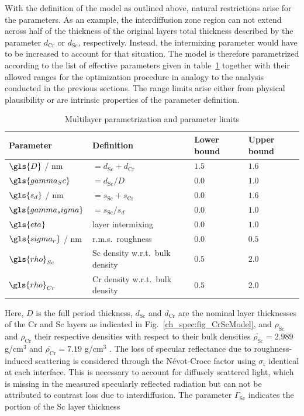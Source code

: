 With the definition of the model as outlined above, natural restrictions arise for the parameters. As an example, the interdiffusion zone region can not extend across half of the thickness of the original layers total thickness described by the parameter $d_\text{Cr}$ or $d_\text{Sc}$, respectively. Instead, the intermixing parameter would have to be increased to account for that situation. The model is therefore parametrized according to the list of effective parameters given in table~\ref{ch_spec:tbl_CrSc_gradual_parametrization} together with their allowed ranges for the optimization procedure in analogy to the analysis conducted in the previous sections. The range limits arise either from physical plausibility or are intrinsic properties of the parameter definition.
\begin{table}[htbp]
\centering
\caption{Multilayer parametrization and parameter limits}
\label{ch_spec:tbl_CrSc_gradual_parametrization}
\begin{tabular}{@{}llll@{}}
\toprule
Parameter & Definition & Lower bound & Upper bound\\ \midrule
$\gls{D}$ / nm & $= d_\text{Sc} + d_\text{Cr}$ & $1.5$&$1.6$ \\ 
$\gls{gamma_Sc}$ & $= d_\text{Sc} / D$&$0.0$ &$1.0$ \\ 
$\gls{s_d}$ / nm&$=s_\text{Sc} + s_\text{Cr}$&$0.0$ & $1.6$\\ 
$\gls{gamma_sigma}$ &$= s_\text{Sc} / s_d$& $0.0$& $1.0$\\ 
$\gls{eta}$ &layer intermixing&$0.0$& $1.0$\\ 
$\gls{sigma_r}$ / nm & r.m.s.~roughness& $0.0$& $0.5$\\ 
$\gls{rho}_{Sc}$ &Sc density w.r.t.~bulk density & $0.5$& $2.0$\\ 
$\gls{rho}_{Cr}$ &Cr density w.r.t.~bulk density& $0.5$& $2.0$\\ 
 \bottomrule
\end{tabular}
\end{table}
Here, $D$ is the full period thickness, $d_\text{Sc}$ and $d_\text{Cr}$ are the 
nominal layer thicknesses of the Cr and Sc layers as indicated in 
Fig.~\ref{ch_spec:fig_CrScModel}, and $\rho_\text{Sc}$ and $\rho_\text{Cr}$ their 
respective densities with respect to their bulk densities 
$\tilde{\rho_\text{Sc}} = 2.989$ g/cm$^3$ and $\tilde{\rho_\text{Cr}} = 7.19$ 
g/cm$^3$ \cite{henke_x-ray_1993}. The loss of specular 
reflectance due to roughness-induced scattering is considered through the 
N\'{e}vot-Croce factor using $\sigma_\text{r}$ identical at each interface. This is necessary to account for diffusely scattered light, which is missing in the measured specularly reflected radiation but can not be attributed to contrast loss due to interdiffusion. The parameter $\Gamma_\text{Sc}$ indicates the portion of the Sc layer thickness 
